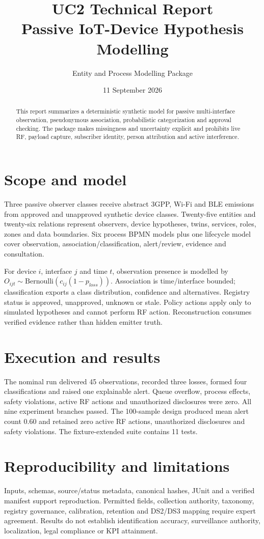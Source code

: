 \documentclass[11pt,a4paper]{article}
\title{UC2 Technical Report\\\large Passive IoT-Device Hypothesis Modelling}
\author{Entity and Process Modelling Package}\date{11 September 2026}
\begin{document}
\maketitle
\begin{abstract}This report summarizes a deterministic synthetic model for passive multi-interface observation, pseudonymous association, probabilistic categorization and approval checking. The package makes missingness and uncertainty explicit and prohibits live RF, payload capture, subscriber identity, person attribution and active interference.\end{abstract}
\section{Scope and model}
Three passive observer classes receive abstract 3GPP, Wi-Fi and BLE emissions from approved and unapproved synthetic device classes. Twenty-five entities and twenty-six relations represent observers, device hypotheses, twins, services, roles, zones and data boundaries. Six process BPMN models plus one lifecycle model cover observation, association/classification, alert/review, evidence and consultation.

For device $i$, interface $j$ and time $t$, observation presence is modelled by $O_{ijt}\sim\mathrm{Bernoulli}(c_{ij}(1-p_{loss}))$. Association is time/interface bounded; classification exports a class distribution, confidence and alternatives. Registry status is approved, unapproved, unknown or stale. Policy actions apply only to simulated hypotheses and cannot perform RF action. Reconstruction consumes verified evidence rather than hidden emitter truth.
\section{Execution and results}
The nominal run delivered 45 observations, recorded three losses, formed four classifications and raised one explainable alert. Queue overflow, process effects, safety violations, active RF actions and unauthorized disclosures were zero. All nine experiment branches passed. The 100-sample design produced mean alert count 0.60 and retained zero active RF actions, unauthorized disclosures and safety violations. The fixture-extended suite contains 11 tests.
\section{Reproducibility and limitations}
Inputs, schemas, source/status metadata, canonical hashes, JUnit and a verified manifest support reproduction. Permitted fields, collection authority, taxonomy, registry governance, calibration, retention and DS2/DS3 mapping require expert agreement. Results do not establish identification accuracy, surveillance authority, localization, legal compliance or KPI attainment.
\end{document}
